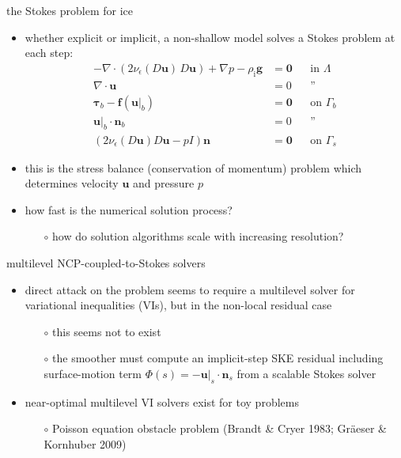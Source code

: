 \documentclass[svgnames,
               hyperref={colorlinks,citecolor=DeepPink4,linkcolor=FireBrick,urlcolor=Maroon},
               usepdftitle=false]  %
               {beamer}
\newcommand{\eps}{\epsilon}
\newcommand{\bbf}{\mathbf{f}}
\newcommand{\bn}{\mathbf{n}}
\newcommand{\bu}{\mathbf{u}}
\newcommand{\btau}{\bm{\tau}}
\newcommand{\bzero}{\bm{0}}
\newcommand{\rhoi}{\rho_{\text{i}}}
\begin{document}
\begin{frame}{the Stokes problem for ice}

\begin{itemize}
\item whether explicit or implicit, a non-shallow model solves a Stokes problem at each step:
\begin{align*}
- \nabla \cdot \left(2 \nu_\eps(D\bu)\, D\bu\right) + \nabla p - \rhoi \mathbf{g} &= \bzero && \text{in $\Lambda$} \\
\nabla \cdot \bu &= 0 && \text{''} \\
\btau_b - \bbf(\bu|_b) &= \bzero && \text{on $\Gamma_b$} \\
\bu|_b \cdot \bn_b &= 0 && \text{''} \\
\left(2 \nu_\eps(D\bu) D\bu - pI\right) \bn &= \bzero && \text{on $\Gamma_s$}
\end{align*}
\item this is the \alert{stress balance} (conservation of momentum) problem which determines velocity $\bu$ and pressure $p$
\item how fast is the numerical solution process?
    \begin{itemize}
    \item[$\circ$] how do solution algorithms \alert{scale with increasing resolution}?
    \end{itemize}
\end{itemize}
\end{frame}




\begin{frame}{multilevel NCP-coupled-to-Stokes solvers}

\begin{itemize}
\item direct attack on the problem seems to require a \alert{multilevel} solver for \alert{variational inequalities} (VIs), but in the \alert{non-local residual case}
    \begin{itemize}
    \item[$\circ$] this seems not to exist
    \item[$\circ$] the \alert{smoother} must compute an implicit-step SKE residual including surface-motion term $\Phi(s) = - \bu|_s\cdot \bn_s$ from a scalable Stokes solver
    \end{itemize}
\item near-optimal multilevel VI solvers exist for toy problems
    \begin{itemize}
    \item[$\circ$] Poisson equation obstacle problem (Brandt \& Cryer 1983; Gr\"aeser \& Kornhuber 2009)
    \end{itemize}
\end{itemize}
\end{frame}
\end{document}
